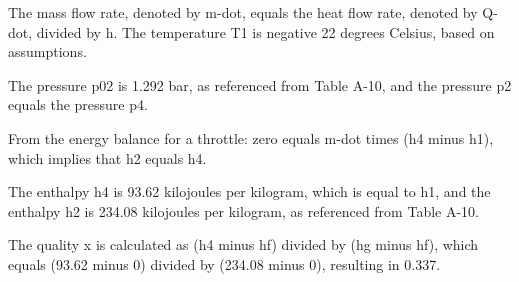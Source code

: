 The mass flow rate, denoted by m-dot, equals the heat flow rate, denoted by Q-dot, divided by h. The temperature T1 is negative 22 degrees Celsius, based on assumptions.

The pressure p02 is 1.292 bar, as referenced from Table A-10, and the pressure p2 equals the pressure p4.

From the energy balance for a throttle: zero equals m-dot times (h4 minus h1), which implies that h2 equals h4.

The enthalpy h4 is 93.62 kilojoules per kilogram, which is equal to h1, and the enthalpy h2 is 234.08 kilojoules per kilogram, as referenced from Table A-10.

The quality x is calculated as (h4 minus hf) divided by (hg minus hf), which equals (93.62 minus 0) divided by (234.08 minus 0), resulting in 0.337.